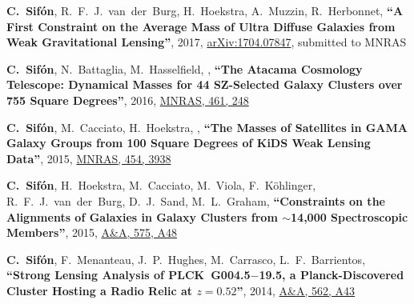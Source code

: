 \documentclass{article}
\def\myself{\textbf{\color{red} C.~Sif\'on}}
\def\aap{A\&A}
\def\mnras{MNRAS}
\newcommand{\submitted}[1]{submitted to #1}
\begin{document}
\vspace{-0.5cm}
\begin{etaremune}

\item
\myself, R.~F.~J.~van~der~Burg, H.~Hoekstra, A.~Muzzin, R.~Herbonnet,
\textbf{``A First Constraint on the Average Mass of Ultra Diffuse Galaxies from 
Weak Gravitational Lensing''},
2017, \href{https://arxiv.org/abs/1704.07847}{arXiv:1704.07847},
\submitted{\mnras}

\item 
\myself, N.~Battaglia, M.~Hasselfield, ,
\textbf{``The Atacama Cosmology Telescope: Dynamical Masses for 44 SZ-Selected Galaxy Clusters over 
755 Square Degrees''},
2016, \href{http://adsabs.harvard.edu/abs/2016MNRAS.461..248S}{\mnras, 461, 248} 

\item
\myself, M.~Cacciato, H.~Hoekstra, ,
\textbf{``The Masses of Satellites in GAMA Galaxy Groups from 100 Square Degrees of KiDS Weak Lensing 
Data''},
2015, \href{https://adsabs.harvard.edu/abs/2015MNRAS.454.3938S}{\mnras, 454, 3938}

\item
\myself, H.~Hoekstra, M.~Cacciato, M.~Viola, F.~K\"ohlinger, R.~F.~J.~van~der~Burg, D.~J.~Sand, 
M.~L.~Graham,
\textbf{``Constraints on the Alignments of Galaxies in Galaxy Clusters from $\sim$14,000 Spectroscopic 
Members''},
2015, \href{https://adsabs.harvard.edu/abs/2015A&A...575A..48S}{\aap, 575, A48}

\item
\myself, F.~Menanteau, J.~P.~Hughes, M.~Carrasco, L.~F.~Barrientos,
\textbf{``Strong Lensing Analysis of PLCK~G004.5$-$19.5, a Planck-Discovered Cluster Hosting a Radio 
Relic at $z=0.52$''},
2014, \href{https://adsabs.harvard.edu/abs/2014A&A...562A..43S}{\aap, 562, A43}


\end{etaremune}
\end{document}
